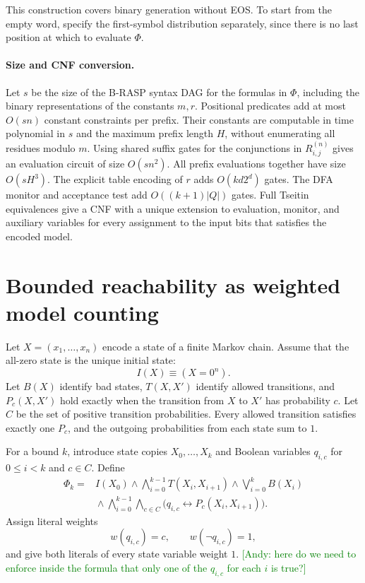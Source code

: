 \documentclass[acmsmall,screen,review,anonymous,nonacm]{PLDI/acmart}
\newcommand{\ajy}[1]{\textcolor{green}{[Andy: #1]}}
\begin{document}
This construction covers binary generation without EOS. To start
from the empty word, specify the first-symbol distribution separately,
since there is no last position at which to evaluate $\Phi$.

\paragraph{Size and CNF conversion.}
Let $s$ be the size of the B-RASP syntax DAG for the formulas in
$\Phi$, including the binary representations of the constants $m,r$.
Positional predicates add at most $O(sn)$ constant constraints per
prefix. Their constants are computable in time polynomial in $s$
and the maximum prefix length $H$, without enumerating all residues
modulo $m$.
Using shared suffix gates for the conjunctions
in $R^{(n)}_{i,j}$ gives an evaluation circuit of size $O(sn^2)$.
All prefix evaluations together have size $O(sH^3)$. The explicit
table encoding of $r$ adds $O(kd2^d)$ gates. The DFA monitor and
acceptance test add $O((k+1)|Q|)$ gates. Full Tseitin equivalences
give a CNF with a unique extension to evaluation, monitor, and
auxiliary variables for every assignment to the input bits that
satisfies the encoded model.

\section{Bounded reachability as weighted model counting}

Let \(X=(x_1,\ldots,x_n)\) encode a state of a finite Markov chain.
Assume that the all-zero state is the unique initial state:
\[
I(X) \equiv (X=0^n).
\]
Let \(B(X)\) identify bad states, \(T(X,X')\) identify allowed
transitions, and \(P_c(X,X')\) hold exactly when the transition
from \(X\) to \(X'\) has probability \(c\).
Let \(C\) be the set of positive transition probabilities.
Every allowed transition satisfies exactly one \(P_c\), and the
outgoing probabilities from each state sum to \(1\).

For a bound \(k\), introduce state copies \(X_0,\ldots,X_k\)
and Boolean variables \(q_{i,c}\) for \(0\leq i<k\) and \(c\in C\).
Define
\[
\begin{aligned}
\Phi_k ={}&
I(X_0)
\land \bigwedge_{i=0}^{k-1} T(X_i,X_{i+1})
\land \bigvee_{i=0}^{k} B(X_i)
\\
&{}\land
\bigwedge_{i=0}^{k-1}\bigwedge_{c\in C}
\bigl(q_{i,c}\leftrightarrow P_c(X_i,X_{i+1})\bigr).
\end{aligned}
\]
Assign literal weights 
\[
w(q_{i,c})=c,
\qquad
w(\neg q_{i,c})=1,
\]
and give both literals of every state variable weight \(1\). \ajy{here do we need to enforce inside the formula that only one of the $q_{i,c}$ for each $i$ is true?}
\end{document}
